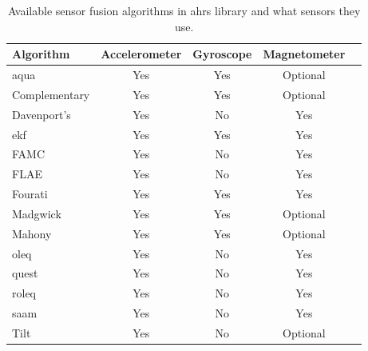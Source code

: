 \begin{table}
    \begin{center}
        \begin{tabular}[t]{lcccc}
            \hline
            Algorithm        & Accelerometer & Gyroscope & Magnetometer \\
            \hline
            \acrshort{aqua}  & Yes           & Yes       & Optional     \\
            Complementary    & Yes           & Yes       & Optional     \\
            Davenport's      & Yes           & No        & Yes          \\
            \acrshort{ekf}   & Yes           & Yes       & Yes          \\
            FAMC             & Yes           & No        & Yes          \\
            FLAE             & Yes           & No        & Yes          \\
            Fourati          & Yes           & Yes       & Yes          \\
            Madgwick         & Yes           & Yes       & Optional     \\
            Mahony           & Yes           & Yes       & Optional     \\
            \acrshort{oleq}  & Yes           & No        & Yes          \\
            \acrshort{quest} & Yes           & No        & Yes          \\
            \acrshort{roleq} & Yes           & No        & Yes          \\
            \acrshort{saam}  & Yes           & No        & Yes          \\
            Tilt             & Yes           & No        & Optional     \\
            \hline
        \end{tabular}
        \caption{Available sensor fusion algorithms in \acrshort{ahrs} library and what sensors they use. \cite{ahrs}}
        \label{tab:ahrs_algorithms}
    \end{center}
\end{table}

